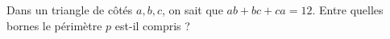 Dans un triangle de côtés $a, b, c$, on sait que $ab + bc + ca = 12$. Entre quelles bornes le périmètre $p$ est-il compris ?

